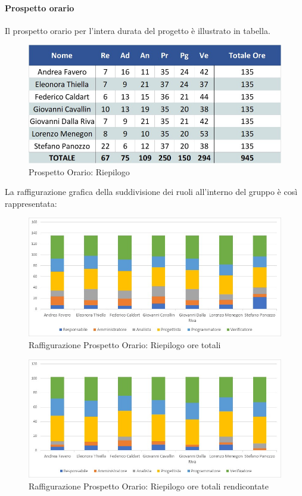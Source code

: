 \paragraph{Prospetto orario}
Il prospetto orario per l'intera durata del progetto è illustrato in tabella. 
\begin{figure}[H]
	\centerline{\includegraphics[scale=0.7]{img/Preventivo/TotaleOre.jpg}}
	\caption{Prospetto Orario: Riepilogo}
	\clearpage
\end{figure}
La raffigurazione grafica della suddivisione dei ruoli all'interno del gruppo è così rappresentata: 
\begin{figure}[H]
	\centerline{\includegraphics[scale=0.85]{img/Preventivo/Istogrammi/Totale.jpg}}
	\caption{Raffigurazione Prospetto Orario: Riepilogo ore totali}
	\clearpage
\end{figure}
\begin{figure}[H]
	\centerline{\includegraphics[scale=0.85]{img/Preventivo/Istogrammi/TotaleRendicontato.jpg}}
	\caption{Raffigurazione Prospetto Orario: Riepilogo ore totali rendicontate}
	\clearpage
\end{figure}
